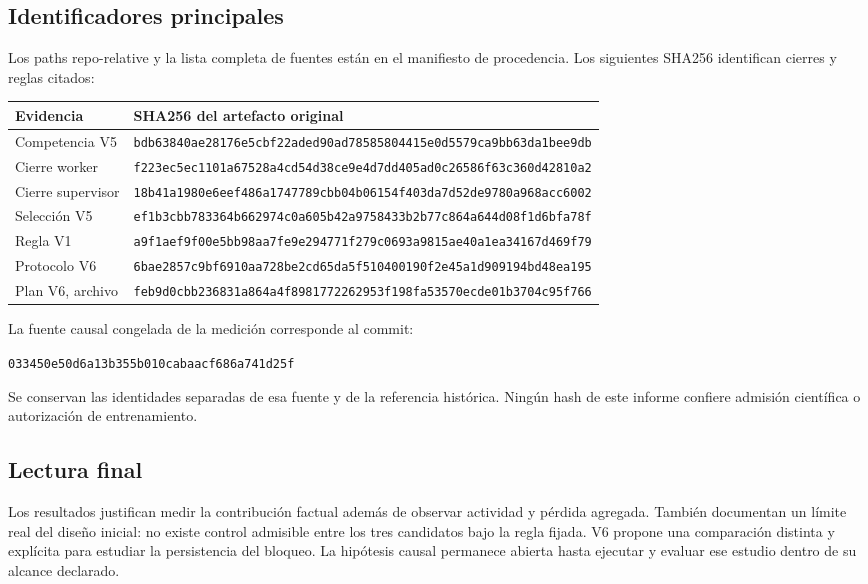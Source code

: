 \documentclass[11pt,a4paper]{article}
\begin{document}
\subsection{Identificadores principales}
Los paths repo-relative y la lista completa de fuentes están en el manifiesto
de procedencia. Los siguientes SHA256 identifican cierres y reglas citados:

{\footnotesize
\begin{tabularx}{\linewidth}{@{}p{32mm}Y@{}}
\toprule
\textbf{Evidencia} & \textbf{SHA256 del artefacto original}\\
\midrule
Competencia V5 & \texttt{bdb63840ae28176e5cbf22aded90ad78585804415e0d5579ca9bb63da1bee9db}\\
Cierre worker & \texttt{f223ec5ec1101a67528a4cd54d38ce9e4d7dd405ad0c26586f63c360d42810a2}\\
Cierre supervisor & \texttt{18b41a1980e6eef486a1747789cbb04b06154f403da7d52de9780a968acc6002}\\
Selección V5 & \texttt{ef1b3cbb783364b662974c0a605b42a9758433b2b77c864a644d08f1d6bfa78f}\\
Regla V1 & \texttt{a9f1aef9f00e5bb98aa7fe9e294771f279c0693a9815ae40a1ea34167d469f79}\\
Protocolo V6 & \texttt{6bae2857c9bf6910aa728be2cd65da5f510400190f2e45a1d909194bd48ea195}\\
Plan V6, archivo & \texttt{feb9d0cbb236831a864a4f8981772262953f198fa53570ecde01b3704c95f766}\\
\bottomrule
\end{tabularx}}

La fuente causal congelada de la medición corresponde al commit:
\begin{center}\texttt{033450e50d6a13b355b010cabaacf686a741d25f}\end{center}
Se conservan las identidades
separadas de esa fuente y de la referencia histórica. Ningún hash de este informe
confiere admisión científica o autorización de entrenamiento.

\subsection{Lectura final}
Los resultados justifican medir la contribución factual además de observar
actividad y pérdida agregada. También documentan un límite real del diseño
inicial: no existe control admisible entre los tres candidatos bajo la regla
fijada. V6 propone una comparación distinta y explícita para estudiar la
persistencia del bloqueo. La hipótesis causal permanece abierta hasta ejecutar
y evaluar ese estudio dentro de su alcance declarado.
\end{document}
